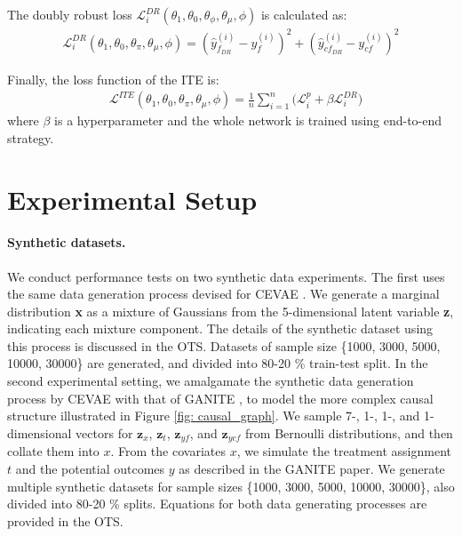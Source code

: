 \documentclass{amia}
\begin{document}
The doubly robust loss $\mathcal{L}_i^{DR} (\theta_1, \theta_0, \theta_\phi, \theta_\mu, \phi)$ is calculated as:
\begin{align}
    \mathcal{L}_i^{DR} (\theta_1, \theta_0, \theta_\pi, \theta_\mu, \phi) = (\hat{y}_{f_{DR}}^{(i)} - y_f^{(i)})^2 + 
    (\hat{y}_{{cf}_{DR}}^{(i)} - y_{cf}^{(i)})^2
    \label{equ: loss_DR}
\end{align}

Finally, the loss function of the ITE is:
\begin{align}
    &\mathcal{L}^{ITE}(\theta_1, \theta_0, \theta_\pi, \theta_\mu ,\phi) = \frac{1}{n}\sum_{i=1}^n \bigg(\mathcal{L}^p_i+ \beta\mathcal{L}_i^{DR}\bigg)
    \label{eq: loss_Final_DR}
\end{align}
where $\beta$ is a hyperparameter and the whole network is trained using end-to-end strategy.

\section*{Experimental Setup}

\paragraph{Synthetic datasets.} We conduct performance tests on two synthetic data experiments.
The first uses the same data generation process devised for CEVAE \cite{louizos2017causal}. We generate a marginal distribution \textbf{x} as a mixture of Gaussians from the 5-dimensional latent variable \textbf{z}, indicating each mixture component. The details of the synthetic dataset using this process is discussed in the OTS. Datasets of sample size \{1000, 3000, 5000, 10000, 30000\} are generated, and divided into 80-20 \% train-test split.
In the second experimental setting, we amalgamate the synthetic data generation process by CEVAE with that of GANITE \cite{Yoon2018}, to model the more complex causal structure illustrated in Figure \ref{fig: causal_graph}. We sample 7-, 1-, 1-, and 1-dimensional vectors for $\textbf{z}_x$, $\textbf{z}_t$, $\textbf{z}_{yf}$, and $\textbf{z}_{ycf}$ from Bernoulli distributions, and then collate them into $x$. From the covariates $x$, we simulate the treatment assignment $t$ and the potential outcomes $y$ as described in the GANITE paper. We generate multiple synthetic datasets for sample sizes \{1000, 3000, 5000, 10000, 30000\}, also divided into 80-20 \% splits. Equations for both data generating processes are provided in the OTS.
\end{document}
